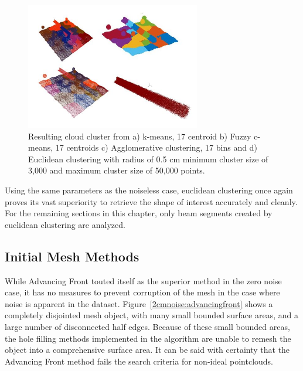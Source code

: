 \documentclass[12pt]{drexelthesis}
\let\Oldsubsection\subsection
\renewcommand{\subsection}{\FloatBarrier\Oldsubsection}
\begin{document}
\begin{figure}[!ht]
	\centering
		\includegraphics[width=3in]{simulated-lab-scan/2cmnoise/comparison.jpg}
		\caption[Comparison of unsupervised segmentation techniques on simulated dataset with induced noise.]{\centering Resulting cloud cluster from a) k-means, 17 centroid b) Fuzzy c-means, 17 centroids c) Agglomerative clustering, 17 bins and d) Euclidean clustering with radius of 0.5 cm minimum cluster size of 3,000 and maximum cluster size of 50,000 points.}
\label{2cmnoise:segcompare}
\end{figure}

Using the same parameters as the noiseless case, euclidean clustering once again proves its vast superiority to retrieve the shape of interest accurately and cleanly. For the remaining sections in this chapter, only beam segments created by euclidean clustering are analyzed.


\subsection{Initial Mesh Methods}

While Advancing Front touted itself as the superior method in the zero noise case, it has no measures to prevent corruption of the mesh in the case where noise is apparent in the dataset. Figure~\ref{2cmnoise:advancingfront} shows a completely disjointed mesh object, with many small bounded surface areas, and a large number of disconnected half edges. Because of these small bounded areas, the hole filling methods implemented in the algorithm are unable to remesh the object into a comprehensive surface area. It can be said with certainty that the Advancing Front method fails the search criteria for non-ideal pointclouds.
\end{document}
